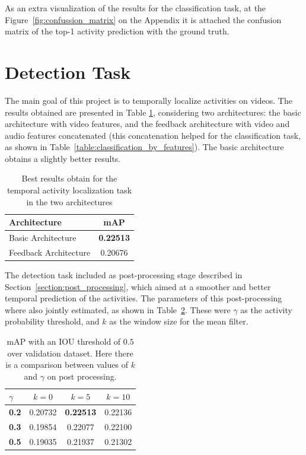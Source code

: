 As an extra visualization of the results for the classification task, at the Figure~\ref{fig:confussion_matrix} on the Appendix it is attached the confusion matrix of the top-1 activity prediction with the ground truth.



\section{Detection Task}

The main goal of this project is to temporally localize activities on videos. The results obtained are presented in Table \ref{table:detection_architecture_comparison}, considering two architectures: the basic architecture with video features, and the feedback architecture with video and audio features concatenated (this concatenation helped for the classification task, as shown in Table~\ref{table:classification_by_features}).
The basic architecture obtains a slightly better results.

\begin{table}[H]
\begin{center}
\begin{tabular}{|l|c|}
\hline
\textbf{Architecture} & \textbf{mAP} \\
\hline\hline
Basic Architecture & \bf0.22513 \\
Feedback Architecture & 0.20676 \\
\hline
\end{tabular}
\end{center}
\caption{Best results obtain for the temporal activity localization task in the two architectures}
\label{table:detection_architecture_comparison}
\end{table}

The detection task included as post-processing stage described in Section~\ref{section:post_processing}, which aimed at a smoother and better temporal prediction of the activities.
The parameters of this post-processing where also jointly estimated, as shown in Table~\ref{table:detection_postprocessing_comparison}.
These were $\gamma$ as the activity probability threshold, and $k$ as the window size for the mean filter.

\begin{table}[H]
\begin{center}
\begin{tabular}{|l|c|c|c|}
\hline
\textbf{$\gamma$} & \textbf{$k=0$} & \textbf{$k=5$} & \textbf{$k=10$} \\
\hline
\textbf{0.2} & 0.20732 & \bf0.22513 & 0.22136 \\
\textbf{0.3} & 0.19854 & 0.22077 & 0.22100 \\
\textbf{0.5} & 0.19035 & 0.21937 & 0.21302 \\
\hline
\end{tabular}
\end{center}
\caption{mAP with an IOU threshold of $0.5$ over validation dataset. Here there is a comparison
between values of $k$ and $\gamma$ on post processing.}
\label{table:detection_postprocessing_comparison}
\end{table}

